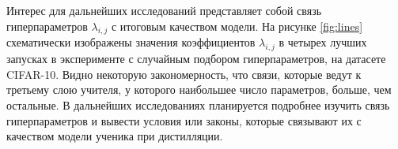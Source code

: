 Интерес для дальнейших исследований представляет собой связь гиперпараметров $\lambda_{i,j}$ с итоговым качеством модели.
На рисунке \ref{fig:lines} схематически изображены значения коэффициентов $\lambda_{i,j}$ в четырех лучших запусках в эксперименте с случайным подбором гиперпараметров,
на датасете CIFAR-10. Видно некоторую закономерность, что связи, которые ведут к третьему слою учителя, у которого наибольшее число параметров, больше, чем остальные.
В дальнейших исследованиях планируется подробнее изучить связь гиперпараметров и вывести условия или законы, которые связывают их с качеством модели ученика при дистилляции.
